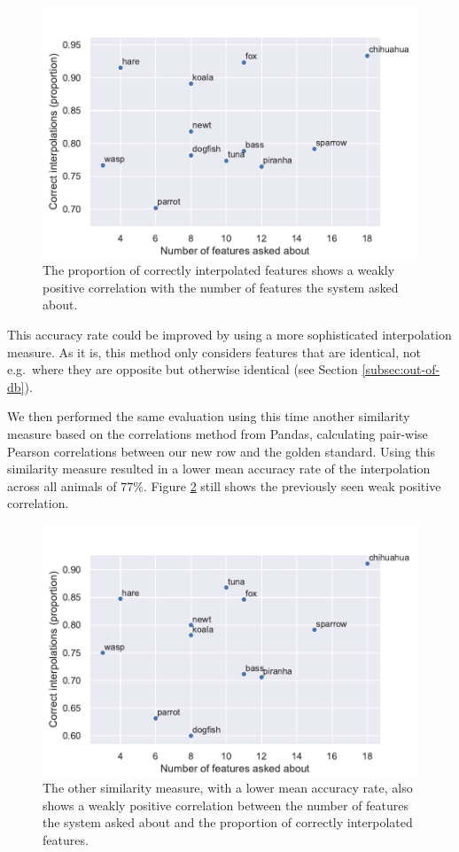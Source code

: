 \documentclass[11pt,a4paper]{article}
\begin{document}
\begin{figure}
	\includegraphics[width=\linewidth]{graphics/interpolation-eval-ours.pdf}
	\caption{The proportion of correctly interpolated features shows a weakly positive correlation with the number of features the system asked about.}
	\label{fig:interp-eval-ours}
\end{figure}

This accuracy rate could be improved by using a more sophisticated interpolation measure.
As it is, this method only considers features that are identical, not e.g.\ where they are opposite but otherwise identical (see Section \ref{subsec:out-of-db}).

We then performed the same evaluation using this time another similarity measure based on the correlations method from Pandas, calculating pair-wise Pearson correlations between our new row and the golden standard. Using this similarity measure resulted in a lower mean accuracy rate of the interpolation across all animals of $77\%$. Figure \ref{fig:interp-eval-corr} still shows the previously seen weak positive correlation. 

\begin{figure}
	\includegraphics[width=\linewidth]{graphics/interpolation-eval-corr.pdf}
	\caption{The other similarity measure, with a lower mean accuracy rate, also shows a weakly positive correlation between the number of features the system asked about and the proportion of correctly interpolated features.}
	\label{fig:interp-eval-corr}
\end{figure}
\end{document}
